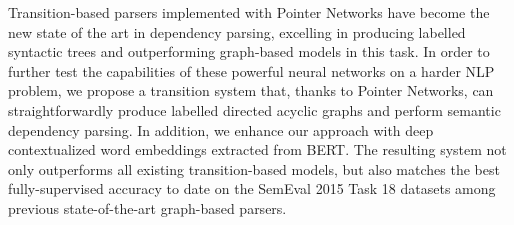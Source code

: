 Transition-based parsers implemented with Pointer Networks  have become the new state of the art in dependency parsing, excelling in producing labelled syntactic trees and outperforming graph-based models in this task. In order to further test the capabilities of these powerful neural networks on a harder NLP problem, we propose a transition system that, thanks to Pointer Networks, can straightforwardly produce labelled directed acyclic graphs and perform semantic dependency parsing. In addition, we enhance our approach with deep contextualized word embeddings extracted from BERT. The resulting system not only outperforms all existing transition-based models, but also matches the best fully-supervised accuracy to date on the SemEval 2015 Task 18 datasets among previous state-of-the-art graph-based parsers.
